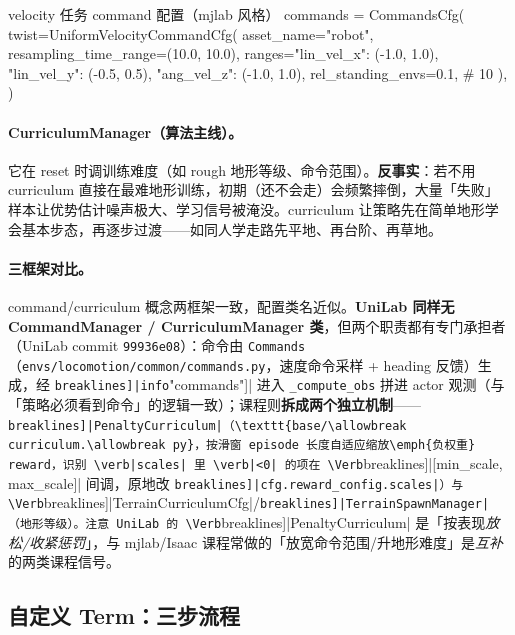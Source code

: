 \begin{codebox}[Python]{velocity 任务 command 配置（mjlab 风格）}
commands = CommandsCfg(
    twist=UniformVelocityCommandCfg(
        asset_name="robot", resampling_time_range=(10.0, 10.0),
        ranges={"lin_vel_x": (-1.0, 1.0), "lin_vel_y": (-0.5, 0.5),
                "ang_vel_z": (-1.0, 1.0)},
        rel_standing_envs=0.1,   # 10%
    ),
)
\end{codebox}

\paragraph{CurriculumManager（算法主线）。}它在 reset 时调训练难度（如 rough 地形等级、命令范围）。\textbf{反事实}：若不用 curriculum 直接在最难地形训练，初期（还不会走）会频繁摔倒，大量「失败」样本让优势估计噪声极大、学习信号被淹没。curriculum 让策略先在简单地形学会基本步态，再逐步过渡——如同人学走路先平地、再台阶、再草地。

\paragraph{三框架对比。}command/curriculum 概念两框架一致，配置类名近似。\textbf{UniLab 同样无 CommandManager / CurriculumManager 类}，但两个职责都有专门承担者（UniLab commit \texttt{99936e08}）：命令由 \verb|Commands|（\texttt{envs/\allowbreak locomotion/\allowbreak common/\allowbreak commands.\allowbreak py}，速度命令采样 + heading 反馈）生成，经 \Verb[breaklines]|info["commands"]| 进入 \verb|_compute_obs| 拼进 actor 观测（与「策略必须看到命令」的逻辑一致）；课程则\textbf{拆成两个独立机制}——\Verb[breaklines]|PenaltyCurriculum|（\texttt{base/\allowbreak curriculum.\allowbreak py}，按滑窗 episode 长度自适应缩放\emph{负权重} reward，识别 \verb|scales| 里 \verb|<0| 的项在 \Verb[breaklines]|[min_scale, max_scale]| 间调，原地改 \Verb[breaklines]|cfg.reward_config.scales|）与 \Verb[breaklines]|TerrainCurriculumCfg|/\allowbreak\Verb[breaklines]|TerrainSpawnManager|（地形等级）。注意 UniLab 的 \Verb[breaklines]|PenaltyCurriculum| 是「按表现\emph{放松/收紧惩罚}」，与 mjlab/Isaac 课程常做的「放宽命令范围/升地形难度」是\emph{互补}的两类课程信号。

\subsection{自定义 Term：三步流程}
\label{sec:rlmc-mgr-customterm}

